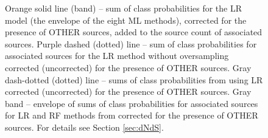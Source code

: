 \documentclass{aa}
\begin{document}
\begin{figure}[h]
{Orange solid line (band) -- sum of class probabilities for the LR model (the envelope of the eight ML methods), corrected for the presence of OTHER sources, added to the source count of associated sources. 
Purple dashed (dotted) line -- sum of class probabilities for associated sources for the LR method without oversampling corrected (uncorrected)
for the presence of OTHER sources.
Gray dash-dotted (dotted) line -- sums of class probabilities from \cite{2016ApJ...820....8S} using LR corrected (uncorrected) for the presence of OTHER sources.
Gray band -- envelope of sums of class probabilities for associated sources for LR and RF methods from \cite{2016ApJ...820....8S} corrected for the presence of OTHER sources.
For details see Section \ref{sec:dNdS}.}  
\label{fig:logN_logS}
\end{figure}
\end{document}
